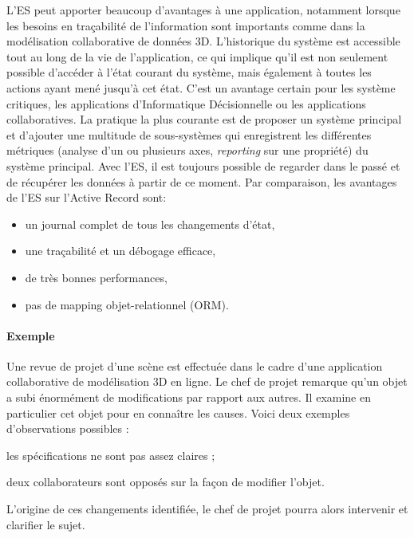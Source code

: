 L'\gls{ES} peut apporter beaucoup d'avantages à une application, notamment 
lorsque les besoins en traçabilité de l'information sont importants comme dans 
la modélisation collaborative de données \gls{3D}.
L'historique du système est accessible tout au long de la vie de l'application, ce 
qui implique qu'il est non seulement possible d'accéder à l'état courant du 
système, mais également à toutes les actions ayant mené jusqu'à cet état. C'est 
un avantage certain pour les système critiques, les applications d'Informatique 
Décisionnelle ou les applications collaboratives. La pratique la plus 
courante est de proposer un système principal et d'ajouter une multitude de 
sous-systèmes qui enregistrent les différentes métriques (analyse d'un ou 
plusieurs axes, \textit{reporting} sur une propriété) du système principal. Avec 
l'\gls{ES}, il est toujours possible de regarder \og dans le passé\fg{} et de 
récupérer les données à partir de ce moment. Par comparaison, les avantages de 
l'\gls{ES} sur l'Active Record sont:
\begin{itemize}
	\item un journal complet de tous les changements d'état,
	\item une traçabilité et un débogage efficace,
	\item de très bonnes performances,
	\item pas de mapping objet-relationnel (ORM).
\end{itemize}

	
\paragraph{Exemple} 
Une revue de projet d'une scène est effectuée dans le cadre d'une application 
collaborative de modélisation \gls{3D} en ligne. Le chef de projet remarque qu'un 
objet a subi énormément de modifications par rapport aux autres. Il examine en 
particulier cet objet pour en connaître les causes. Voici deux exemples 
d'observations possibles : 
\begin{enumerate*}[label=(\roman*)]
	\item les spécifications ne sont pas assez claires ;
	\item deux collaborateurs sont opposés sur la façon de modifier l'objet.
\end{enumerate*}
L'origine de ces changements identifiée, le chef de projet pourra alors intervenir 
et clarifier le sujet. 

